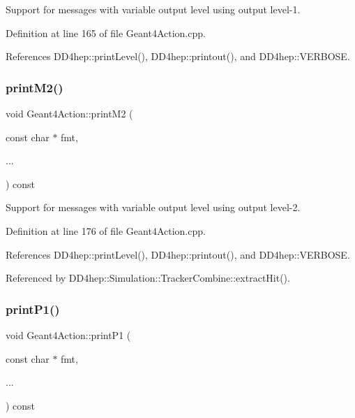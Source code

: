Support for messages with variable output level using output level-\/1. 



Definition at line 165 of file Geant4\+Action.\+cpp.



References D\+D4hep\+::print\+Level(), D\+D4hep\+::printout(), and D\+D4hep\+::\+V\+E\+R\+B\+O\+SE.

\hypertarget{class_d_d4hep_1_1_simulation_1_1_geant4_action_a973b20385610fd757154eff3635c55a1}{}\label{class_d_d4hep_1_1_simulation_1_1_geant4_action_a973b20385610fd757154eff3635c55a1} 
\subsubsection{\texorpdfstring{print\+M2()}{printM2()}}
{\footnotesize\ttfamily void Geant4\+Action\+::print\+M2 (\begin{DoxyParamCaption}\item[{const char $\ast$}]{fmt,  }\item[{}]{... }\end{DoxyParamCaption}) const}



Support for messages with variable output level using output level-\/2. 



Definition at line 176 of file Geant4\+Action.\+cpp.



References D\+D4hep\+::print\+Level(), D\+D4hep\+::printout(), and D\+D4hep\+::\+V\+E\+R\+B\+O\+SE.



Referenced by D\+D4hep\+::\+Simulation\+::\+Tracker\+Combine\+::extract\+Hit().

\hypertarget{class_d_d4hep_1_1_simulation_1_1_geant4_action_ae90c8c67240ca2a418d38a1c8a924077}{}\label{class_d_d4hep_1_1_simulation_1_1_geant4_action_ae90c8c67240ca2a418d38a1c8a924077} 
\subsubsection{\texorpdfstring{print\+P1()}{printP1()}}
{\footnotesize\ttfamily void Geant4\+Action\+::print\+P1 (\begin{DoxyParamCaption}\item[{const char $\ast$}]{fmt,  }\item[{}]{... }\end{DoxyParamCaption}) const}



